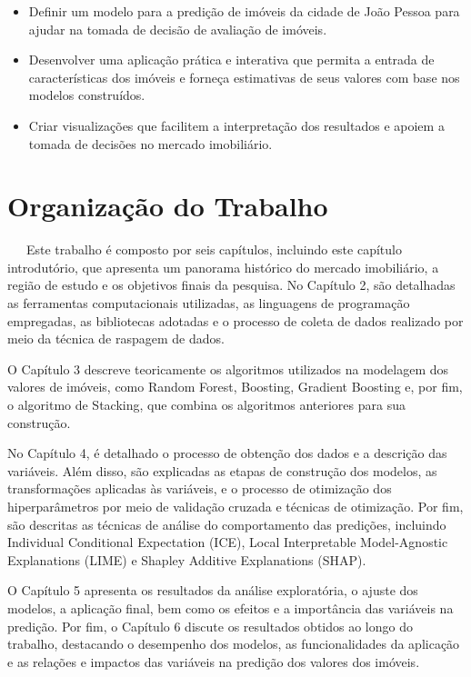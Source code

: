 \documentclass[
  12pt,
  a4paper,
]{scrreprt}
\begin{document}
\begin{itemize}
\item
  Definir um modelo para a predição de imóveis da cidade de João Pessoa
  para ajudar na tomada de decisão de avaliação de imóveis.
\item
  Desenvolver uma aplicação prática e interativa que permita a entrada
  de características dos imóveis e forneça estimativas de seus valores
  com base nos modelos construídos.
\item
  Criar visualizações que facilitem a interpretação dos resultados e
  apoiem a tomada de decisões no mercado imobiliário.
\end{itemize}

\section{Organização do Trabalho}\label{organizauxe7uxe3o-do-trabalho}

~~~Este trabalho é composto por seis capítulos, incluindo este capítulo
introdutório, que apresenta um panorama histórico do mercado
imobiliário, a região de estudo e os objetivos finais da pesquisa. No
Capítulo 2, são detalhadas as ferramentas computacionais utilizadas, as
linguagens de programação empregadas, as bibliotecas adotadas e o
processo de coleta de dados realizado por meio da técnica de raspagem de
dados.

\vspace{12pt}

O Capítulo 3 descreve teoricamente os algoritmos utilizados na modelagem
dos valores de imóveis, como Random Forest, Boosting, Gradient Boosting
e, por fim, o algoritmo de Stacking, que combina os algoritmos
anteriores para sua construção.

\vspace{12pt}

No Capítulo 4, é detalhado o processo de obtenção dos dados e a
descrição das variáveis. Além disso, são explicadas as etapas de
construção dos modelos, as transformações aplicadas às variáveis, e o
processo de otimização dos hiperparâmetros por meio de validação cruzada
e técnicas de otimização. Por fim, são descritas as técnicas de análise
do comportamento das predições, incluindo Individual Conditional
Expectation (ICE), Local Interpretable Model-Agnostic Explanations
(LIME) e Shapley Additive Explanations (SHAP).

\vspace{12pt}

O Capítulo 5 apresenta os resultados da análise exploratória, o ajuste
dos modelos, a aplicação final, bem como os efeitos e a importância das
variáveis na predição. Por fim, o Capítulo 6 discute os resultados
obtidos ao longo do trabalho, destacando o desempenho dos modelos, as
funcionalidades da aplicação e as relações e impactos das variáveis na
predição dos valores dos imóveis.
\end{document}
